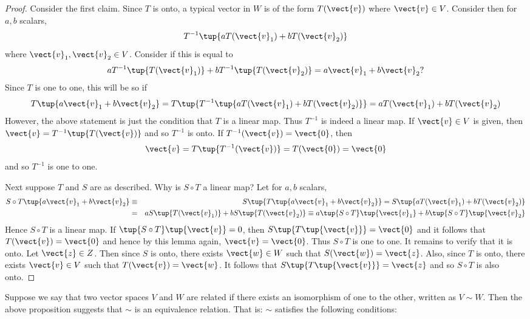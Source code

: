 \begin{proof}
Consider the first claim. Since $T$ is onto, a typical
vector in $W$ is of the form $T(\vect{v})$ where $\vect{v} \in V$. Consider then for $a,b$
scalars, 
\begin{equation*}
T^{-1}\tup{aT(\vect{v}_{1})+bT(\vect{v}_{2})}
\end{equation*}
where $\vect{v}_{1}, \vect{v}_2 \in V$. Consider if this is equal to 
\begin{equation*}
aT^{-1}\tup{T(\vect{v}_{1})} +bT^{-1}\tup{T(\vect{v}_{2})} =a\vect{v}_{1}+b\vect{v}_{2}?
\end{equation*}
Since $T$ is one to one, this will be so if 
\begin{equation*}
T\tup{a\vect{v}_{1}+b\vect{v}_{2}} =T\tup{T^{-1}\tup{aT(\vect{v}_{1})+bT(\vect{v}_{2})}
} =aT(\vect{v}_{1})+bT(\vect{v}_{2})
\end{equation*}
However, the above statement is just the condition that $T$ is a linear map.
Thus $T^{-1}$ is indeed a linear map. If $\vect{v} \in V$ is given, then $
\vect{v}=T^{-1}\tup{T(\vect{v})} $ and so $T^{-1}$ is onto. If $T^{-1}(\vect{v})=\vect{0}$, then 
\begin{equation*}
\vect{v}=T\tup{T^{-1}(\vect{v})} =T(\vect{0})=\vect{0}
\end{equation*}
and so  $T^{-1}$ is one to one.

Next suppose $T$ and $S$ are as described. Why is $S\circ T$ a linear map?
Let for $a,b$ scalars,
\begin{eqnarray*}
S\circ T\tup{a\vect{v}_{1}+b\vect{v}_{2}} &\equiv &S\tup{T\tup{
a\vect{v}_{1}+b\vect{v}_{2}} } =S\tup{aT(\vect{v}_{1})+bT(\vect{v}_{2})} \\
&=&aS\tup{T(\vect{v}_{1})} +bS\tup{T(\vect{v}_{2})} \equiv a\tup{S\circ
T} \tup{\vect{v}_{1}} +b\tup{S\circ T} \tup{\vect{v}_{2}}
\end{eqnarray*}
Hence $S\circ T$ is a linear map. If $\tup{S\circ T} \tup{\vect{v}}
=0$, then $S\tup{T\tup{\vect{v} } } =\vect{0}$ and it follows that $T(\vect{v})=\vect{0}$ and hence by this lemma again, $\vect{v}=\vect{0}$. Thus $S\circ
T $ is one to one. It remains to verify that it is onto. Let $\vect{z}\in Z$. Then
since $S$ is onto, there exists $\vect{w}\in W$ such that $S(\vect{w})=\vect{z}$. Also, since $T$
is onto, there exists $\vect{v}\in V$ such that $T(\vect{v})=\vect{w}$. It follows that $S\tup{
T\tup{\vect{v}} } =\vect{z}$ and so $S\circ T$ is also onto.
\end{proof}

Suppose we say that two vector spaces $V$ and $W$ are related if there exists an isomorphism of one to the other, written as $V\sim W$. 
Then the above proposition suggests that $\sim $ is an equivalence relation. That is: $\sim $
satisfies the following conditions:

